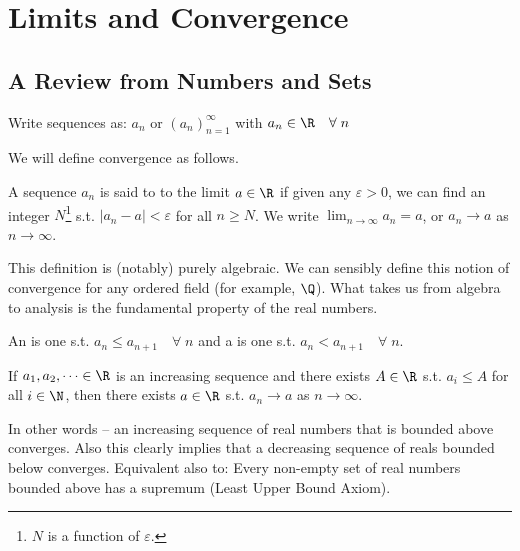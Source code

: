 \section{Limits and Convergence} \label{sec:1.1}

\subsection{A Review from Numbers and Sets}

\begin{notation}
	Write sequences as: $a_n$ or $(a_n)_{n=1}^\infty$ with $a_n \in \R \quad \forall \; n$
\end{notation}

We will define convergence as follows.

\begin{definition}[Convergence]
	A sequence $a_n$ is said to  to the limit $a \in \R$ if given any $\varepsilon > 0$, we can find an integer $N$\footnote{$N$ is a function of $\varepsilon$.} s.t. $|a_n - a| < \varepsilon$ for all $n \geq N$. We write $\displaystyle\lim_{n \to \infty}a_n = a$, or $a_n \rightarrow a$ as $n \rightarrow \infty$.
\end{definition}

This definition is (notably) purely algebraic. We can sensibly define this notion of convergence for any ordered field (for example, $\Q$). What takes us from algebra to analysis is the fundamental property of the real numbers.

\begin{definition}
	An  is one s.t. $a_n \leq a_{n + 1} \quad \forall \; n$ and a  is one s.t. $a_n < a_{n + 1} \quad \forall \; n$.
\end{definition} 

\begin{axiomthm} \label{axm:fundamental}
If $a_1, a_2, \dots \in \R$ is an increasing sequence and there exists $A \in \R$ s.t. $a_i \leq A$ for all $i \in \N$, then there exists $a \in \R$ s.t. $a_n \rightarrow a$ as $n \rightarrow \infty$.
\end{axiomthm}

In other words -- an increasing sequence of real numbers that is bounded above converges. 
Also this clearly implies that a decreasing sequence of reals bounded below converges.
Equivalent also to: Every non-empty set of real numbers bounded above has a supremum (Least Upper Bound Axiom).

